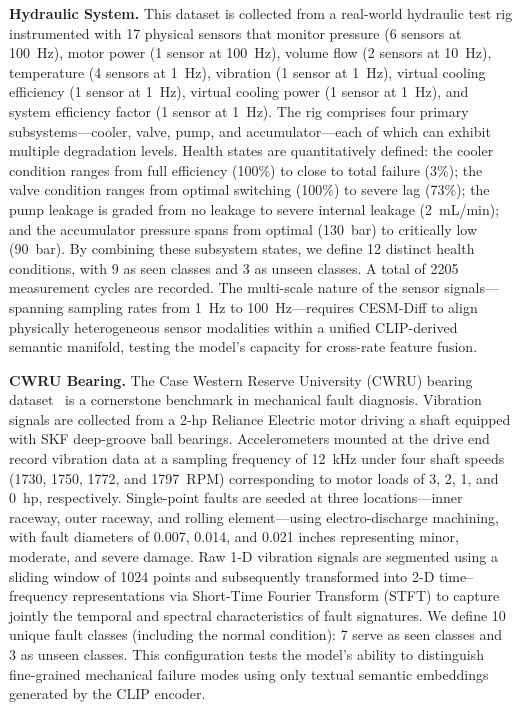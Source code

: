 \textbf{Hydraulic System.} This dataset is collected from a real-world hydraulic test rig instrumented with 17 physical sensors that monitor pressure (6 sensors at 100~Hz), motor power (1 sensor at 100~Hz), volume flow (2 sensors at 10~Hz), temperature (4 sensors at 1~Hz), vibration (1 sensor at 1~Hz), virtual cooling efficiency (1 sensor at 1~Hz), virtual cooling power (1 sensor at 1~Hz), and system efficiency factor (1 sensor at 1~Hz). The rig comprises four primary subsystems---cooler, valve, pump, and accumulator---each of which can exhibit multiple degradation levels. Health states are quantitatively defined: the cooler condition ranges from full efficiency (100\%) to close to total failure (3\%); the valve condition ranges from optimal switching (100\%) to severe lag (73\%); the pump leakage is graded from no leakage to severe internal leakage (2~mL/min); and the accumulator pressure spans from optimal (130~bar) to critically low (90~bar). By combining these subsystem states, we define 12 distinct health conditions, with 9 as seen classes and 3 as unseen classes. A total of 2205 measurement cycles are recorded. The multi-scale nature of the sensor signals---spanning sampling rates from 1~Hz to 100~Hz---requires CESM-Diff to align physically heterogeneous sensor modalities within a unified CLIP-derived semantic manifold, testing the model's capacity for cross-rate feature fusion.

\textbf{CWRU Bearing.} The Case Western Reserve University (CWRU) bearing dataset~\cite{cwru_dataset} is a cornerstone benchmark in mechanical fault diagnosis. Vibration signals are collected from a 2-hp Reliance Electric motor driving a shaft equipped with SKF deep-groove ball bearings. Accelerometers mounted at the drive end record vibration data at a sampling frequency of 12~kHz under four shaft speeds (1730, 1750, 1772, and 1797~RPM) corresponding to motor loads of 3, 2, 1, and 0~hp, respectively. Single-point faults are seeded at three locations---inner raceway, outer raceway, and rolling element---using electro-discharge machining, with fault diameters of 0.007, 0.014, and 0.021 inches representing minor, moderate, and severe damage. Raw 1-D vibration signals are segmented using a sliding window of 1024 points and subsequently transformed into 2-D time--frequency representations via Short-Time Fourier Transform (STFT) to capture jointly the temporal and spectral characteristics of fault signatures. We define 10 unique fault classes (including the normal condition): 7 serve as seen classes and 3 as unseen classes. This configuration tests the model's ability to distinguish fine-grained mechanical failure modes using only textual semantic embeddings generated by the CLIP encoder.

